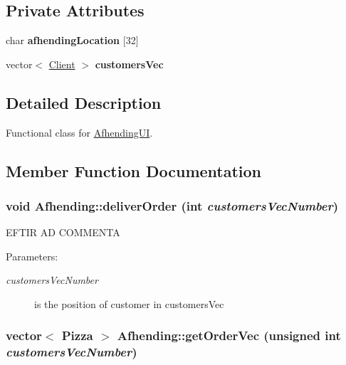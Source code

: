 \subsection*{Private Attributes}
\begin{CompactItemize}
\item 
\hypertarget{class_afhending_85acd631eb078696afb9935bedeeb107}{
char {\bf afhending\-Location} \mbox{[}32\mbox{]}}
\label{class_afhending_85acd631eb078696afb9935bedeeb107}

\item 
\hypertarget{class_afhending_52cc86469dd41b9be5b7186d6bd00589}{
vector$<$ \hyperlink{class_client}{Client} $>$ {\bf customers\-Vec}}
\label{class_afhending_52cc86469dd41b9be5b7186d6bd00589}

\end{CompactItemize}


\subsection{Detailed Description}
Functional class for \hyperlink{class_afhending_u_i}{Afhending\-UI}. 



\subsection{Member Function Documentation}
\hypertarget{class_afhending_b3cb078e2502d2eb7e6e67623cbe30b9}{
\subsubsection[deliverOrder]{\setlength{\rightskip}{0pt plus 5cm}void Afhending::deliver\-Order (int {\em customers\-Vec\-Number})}}
\label{class_afhending_b3cb078e2502d2eb7e6e67623cbe30b9}


EFTIR AD  COMMENTA

\begin{Desc}
\item[Parameters:]
\begin{description}
\item[{\em customers\-Vec\-Number}]is the position of customer in customers\-Vec \end{description}
\end{Desc}
\hypertarget{class_afhending_ad0cbeddec394b25c5eade57247f4110}{
\subsubsection[getOrderVec]{\setlength{\rightskip}{0pt plus 5cm}vector$<$ Pizza $>$ Afhending::get\-Order\-Vec (unsigned int {\em customers\-Vec\-Number})}}
\label{class_afhending_ad0cbeddec394b25c5eade57247f4110}


